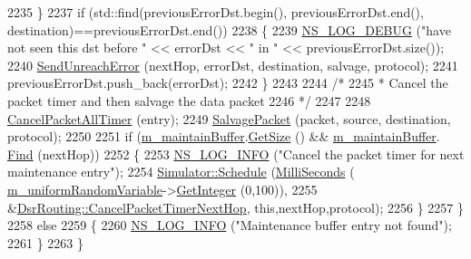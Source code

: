 \begin{DoxyCode}
2235         \}
2237       \textcolor{keywordflow}{if} (std::find(previousErrorDst.begin(), previousErrorDst.end(), destination)==previousErrorDst.end())
2238       \{
2239         \hyperlink{group__logging_ga413f1886406d49f59a6a0a89b77b4d0a}{NS\_LOG\_DEBUG} (\textcolor{stringliteral}{"have not seen this dst before "} << errorDst << \textcolor{stringliteral}{" in "} << 
      previousErrorDst.size());
2240         \hyperlink{classns3_1_1dsr_1_1DsrRouting_ace5dd08bac91fa199ddfac7e81125a62}{SendUnreachError} (nextHop, errorDst, destination, salvage, protocol);
2241         previousErrorDst.push\_back(errorDst);
2242       \}
2243 
2244       \textcolor{comment}{/*}
2245 \textcolor{comment}{       * Cancel the packet timer and then salvage the data packet}
2246 \textcolor{comment}{       */}
2247 
2248       \hyperlink{classns3_1_1dsr_1_1DsrRouting_afb3145517b31e5a0e2016ac496c86050}{CancelPacketAllTimer} (entry);
2249       \hyperlink{classns3_1_1dsr_1_1DsrRouting_a83dd51056e4e48ad538ff41fda129272}{SalvagePacket} (packet, source, destination, protocol);
2250 
2251       \textcolor{keywordflow}{if} (\hyperlink{classns3_1_1dsr_1_1DsrRouting_ac9d28a64437fbe20a4228c9811f9fc27}{m\_maintainBuffer}.\hyperlink{classns3_1_1dsr_1_1DsrMaintainBuffer_a7df015a7d740c8b442df20f4ab3895b7}{GetSize} () && \hyperlink{classns3_1_1dsr_1_1DsrRouting_ac9d28a64437fbe20a4228c9811f9fc27}{m\_maintainBuffer}.
      \hyperlink{classns3_1_1dsr_1_1DsrMaintainBuffer_a42eaded41fd2aeb05dbf0261a130281a}{Find} (nextHop))
2252         \{
2253           \hyperlink{group__logging_gafbd73ee2cf9f26b319f49086d8e860fb}{NS\_LOG\_INFO} (\textcolor{stringliteral}{"Cancel the packet timer for next maintenance entry"});
2254           \hyperlink{classns3_1_1Simulator_a671882c894a08af4a5e91181bf1eec13}{Simulator::Schedule} (\hyperlink{group__timecivil_gaf26127cf4571146b83a92ee18679c7a9}{MilliSeconds} (
      \hyperlink{classns3_1_1dsr_1_1DsrRouting_a22a85b3510166ffdd451e4010f996f0f}{m\_uniformRandomVariable}->\hyperlink{classns3_1_1RandomVariableStream_a66cd94e6305ce7f000f1a9ff0fcb9aef}{GetInteger} (0,100)),
2255                                &\hyperlink{classns3_1_1dsr_1_1DsrRouting_a215e6fcab10ee0d744a657f0af2695c6}{DsrRouting::CancelPacketTimerNextHop},\textcolor{keyword}{
      this},nextHop,protocol);
2256         \}
2257     \}
2258   \textcolor{keywordflow}{else}
2259     \{
2260       \hyperlink{group__logging_gafbd73ee2cf9f26b319f49086d8e860fb}{NS\_LOG\_INFO} (\textcolor{stringliteral}{"Maintenance buffer entry not found"});
2261     \}
2263 \}
\end{DoxyCode}


